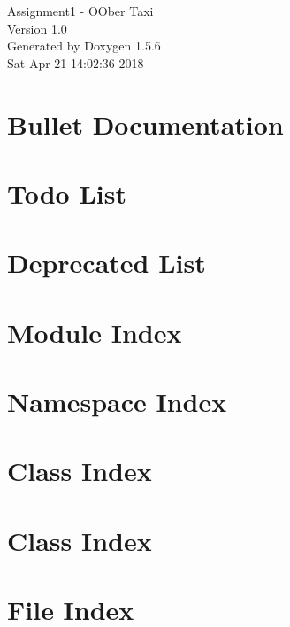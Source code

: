 \documentclass[a4paper]{book}
\begin{document}
\begin{titlepage}
\vspace*{7cm}
\begin{center}
{\Large Assignment1 - OOber Taxi \\[1ex]\large Version 1.0 }\\
\vspace*{1cm}
{\large Generated by Doxygen 1.5.6}\\
\vspace*{0.5cm}
{\small Sat Apr 21 14:02:36 2018}\\
\end{center}
\end{titlepage}
\clearemptydoublepage
{}
\tableofcontents
\clearemptydoublepage
{}
\chapter{Bullet Documentation}
\label{index}\hypertarget{index}{}
\chapter{Todo List}
\label{todo}
\hypertarget{todo}{}

\chapter{Deprecated List}
\label{deprecated}
\hypertarget{deprecated}{}

\chapter{Module Index}

\chapter{Namespace Index}

\chapter{Class Index}

\chapter{Class Index}

\chapter{File Index}

\end{document}
